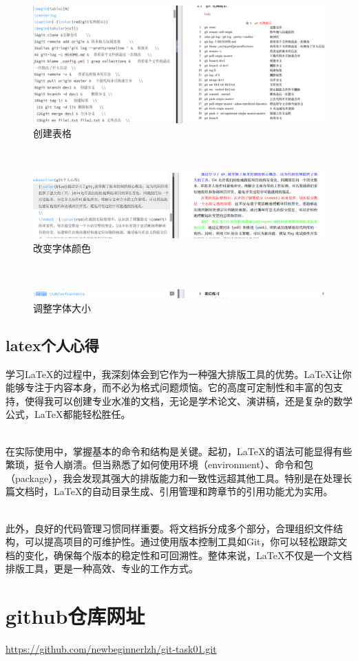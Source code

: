 \documentclass[a4paper, 12pt]{article}
\begin{document}
\\
    \begin{figure}[H]
  \centering
  \includegraphics[width=1\textwidth]{屏幕截图 2024-08-29 201017.png}
  \caption{创建表格}
    \end{figure}
\\
    \begin{figure}[H]
  \centering
  \includegraphics[width=1\textwidth]{屏幕截图 2024-08-29 201732.png}
  \caption{改变字体颜色}
    \end{figure}
\\
    \begin{figure}[H]
  \centering
  \includegraphics[width=1\textwidth]{屏幕截图 2024-08-29 201920.png}
  \caption{调整字体大小}
    \end{figure}

\subsection{latex个人心得}

{\color{red}学习LaTeX的过程中，我深刻体会到它作为一种强大排版工具的优势。LaTeX让你能够专注于内容本身，而不必为格式问题烦恼。它的高度可定制性和丰富的包支持，使得我可以创建专业水准的文档，无论是学术论文、演讲稿，还是复杂的数学公式，LaTeX都能轻松胜任。}

\\

{\color{blue}\indent 在实际使用中，掌握基本的命令和结构是关键。起初，LaTeX的语法可能显得有些繁琐，挺令人崩溃。但当熟悉了如何使用环境（environment）、命令和包（package），我会发现其强大的排版能力和一致性远超其他工具。特别是在处理长篇文档时，LaTeX的自动目录生成、引用管理和跨章节的引用功能尤为实用。}
    

\\
{\color{green}\indent  此外，良好的代码管理习惯同样重要。将文档拆分成多个部分，合理组织文件结构，可以提高项目的可维护性。通过使用版本控制工具如Git，你可以轻松跟踪文档的变化，确保每个版本的稳定性和可回溯性。整体来说，LaTeX不仅是一个文档排版工具，更是一种高效、专业的工作方式。}

\section{github仓库网址}
\href{https://github.com/newbeginnerlzh/git-task01.git}{\color{red}https://github.com/newbeginnerlzh/git-task01.git}
\end{document}
